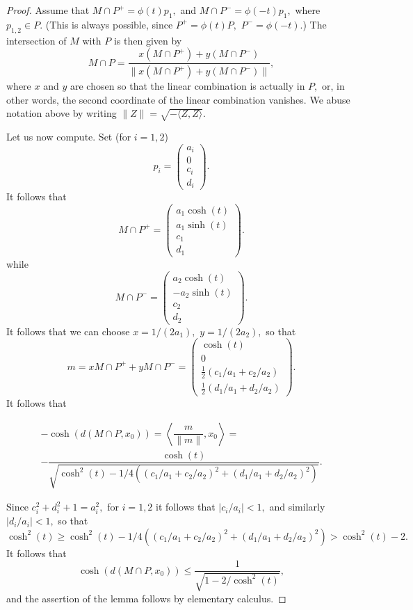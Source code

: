 \documentclass[12pt]{amsart}
\theoremstyle{remark}
\begin{document}
\begin{proof}
Assume that 
$M\cap P^+ = \phi(t)  p_1,$ and $M\cap P^- = \phi(-t) p_1,$ where $p_{1, 2} \in P.$ (This is always possible, since $P^+ = \phi(t) P,$ $P^- = \phi(-t).$) The intersection of $M$ with $P$ is then given by 
\[
M\cap P = \dfrac{x (M \cap P^+) + y(M \cap P^-)}{\|x (M \cap P^+) + y(M \cap P^-)\|},
\]
where $x$ and $y$ are chosen so that the linear combination is actually in $P,$ or, in other words, the second coordinate of the linear combination vanishes. We abuse notation above by writing
$\|Z\| = \sqrt{-\langle Z, Z\rangle}.$

Let us now compute. Set (for $i=1, 2$)
\[
p_i = \begin{pmatrix} a_i\\0\\c_i\\d_i\end{pmatrix}.
\]
It follows that 
\[
M\cap P^+ = \begin{pmatrix}a_1 \cosh(t) \\ a_1 \sinh(t)\\ c_1 \\ d_1\end{pmatrix}.
\]
while
\[
M \cap P^- = \begin{pmatrix}a_2 \cosh(t) \\ - a_2 \sinh(t) \\ c_2 \\d_2 \end{pmatrix}.
\]
It follows that we can choose $x = 1/(2a_1),$ $y = 1/(2a_2),$
so that
\[
m = x M\cap P^+ + y M\cap P^- = \begin{pmatrix} \cosh(t) \\0 \\ \frac{1}{2}( c_1/a_1 + c_2/a_2) \\ \frac{1}{2} ( d_1/a_1 + d_2/a_2) \end{pmatrix}.
\]
It follows that 

\begin{multline}
- \cosh(d(M \cap P, x_0)) = \left\langle \dfrac{m}{\|m\|}, x_0\right\rangle = \\ -\dfrac{\cosh(t)}{\sqrt{\cosh^2(t) - 1/4\left((c_1/a_1 + c_2/a_2)^2 + (d_1/a_1 + d_2/a_2)^2\right)}}.
\end{multline}

Since $c_i^2 + d_i^2 + 1 = a_i^2,$ for $i=1,2$ it follows that $|c_i/a_i| < 1,$ and similarly $|d_i/a_i| < 1,$ so that 
\[
\cosh^2(t) \geq \cosh^2(t) - 
 1/4\left((c_1/a_1 + c_2/a_2)^2 + (d_1/a_1 + d_2/a_2)^2\right) > \cosh^2(t) -2.
 \]
 It follows that 
 \[
\cosh(d(M \cap P, x_0))\leq \dfrac{1}{\sqrt{1-2/\cosh^2(t)}},
 \]
 and the assertion of the lemma follows by elementary calculus.
\end{proof}
\end{document}
